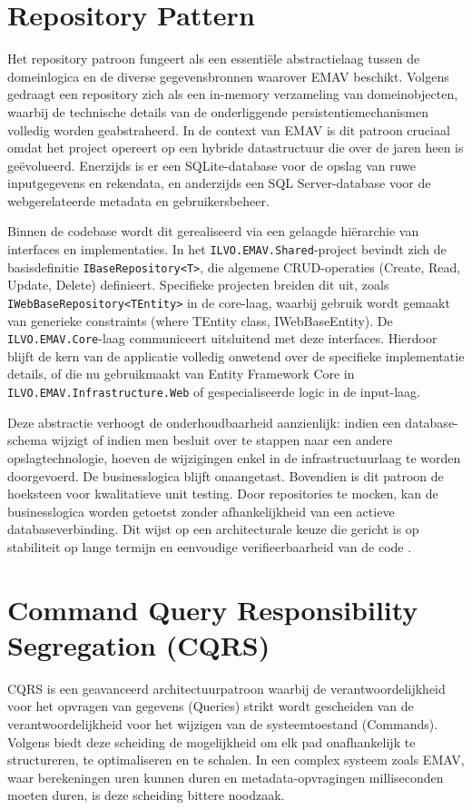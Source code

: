 \section{Repository Pattern}
{\sloppy Het repository patroon fungeert als een essentiële abstractielaag tussen de domeinlogica en de diverse gegevensbronnen waarover EMAV beschikt. Volgens \textcite{fowlerRepository} gedraagt een repository zich als een in-memory verzameling van domeinobjecten, waarbij de technische details van de onderliggende persistentiemechanismen volledig worden geabstraheerd. In de context van EMAV is dit patroon cruciaal omdat het project opereert op een hybride datastructuur die over de jaren heen is geëvolueerd. Enerzijds is er een SQLite-database voor de opslag van ruwe inputgegevens en rekendata, en anderzijds een SQL Server-database voor de webgerelateerde metadata en gebruikersbeheer.\par}

Binnen de codebase wordt dit gerealiseerd via een gelaagde hiërarchie van interfaces en implementaties. 
In het \texttt{ILVO.EMAV.Shared}-project bevindt zich de basisdefinitie \texttt{IBaseRepository<T>}, die algemene CRUD-operaties (Create, Read, Update, Delete) definieert. 
Specifieke projecten breiden dit uit, zoals \texttt{IWebBaseRepository<TEntity>} in de core-laag, waarbij gebruik wordt gemaakt van generieke constraints (where TEntity \: class, IWebBaseEntity). 
De \texttt{ILVO.EMAV.Core}-laag communiceert uitsluitend met deze interfaces. 
Hierdoor blijft de kern van de applicatie volledig onwetend over de specifieke implementatie details, of die nu gebruikmaakt van Entity Framework Core in \texttt{ILVO.EMAV.Infrastructure.Web} of gespecialiseerde logic in de input-laag.

Deze abstractie verhoogt de onderhoudbaarheid aanzienlijk: indien een database-schema wijzigt of indien men besluit over te stappen naar een andere opslagtechnologie, hoeven de wijzigingen enkel in de infrastructuurlaag te worden doorgevoerd. 
De businesslogica blijft onaangetast. 
Bovendien is dit patroon de hoeksteen voor kwalitatieve unit testing. 
Door repositories te mocken, kan de businesslogica worden getoetst zonder afhankelijkheid van een actieve databaseverbinding. 
Dit wijst op een architecturale keuze die gericht is op stabiliteit op lange termijn en eenvoudige verifieerbaarheid van de code \autocite{millett2015patterns}.

\section{Command Query Responsibility Segregation (CQRS)}
{\sloppy CQRS is een geavanceerd architectuurpatroon waarbij de verantwoordelijkheid voor het opvragen van gegevens (Queries) strikt wordt gescheiden van de verantwoordelijkheid voor het wijzigen van de systeemtoestand (Commands). Volgens \textcite{fowlerCQRS} biedt deze scheiding de mogelijkheid om elk pad onafhankelijk te structureren, te optimaliseren en te schalen. In een complex systeem zoals EMAV, waar berekeningen uren kunnen duren en metadata-opvragingen milliseconden moeten duren, is deze scheiding bittere noodzaak.\par}

